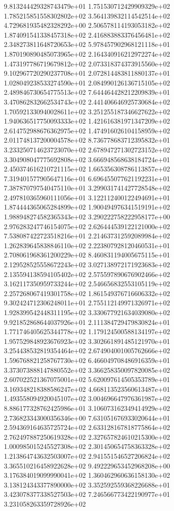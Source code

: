 9.813244429328743479e+01 1.751530712429909329e+02 1.785215851558302802e+02
3.564139832114542514e+02 4.729681935482328292e+00 2.506578114193053182e+02
1.874091541338457318e+02 2.416883883376456481e+02 2.348273811648720653e+02
5.978457902968121118e+01 1.870190890485073965e+02 2.164340916212972274e+02
1.473197786719679812e+02 2.073318374373915560e+02 9.102967720290237708e+01
2.072814483811880137e+01 1.028049238533274590e+01 2.084990126136715105e+02
2.489846730654775513e+02 7.644464428212209839e+01 3.470862832662534743e+02
2.441406646925730684e+02 1.705921330940028611e+02 3.251255187346627622e+02
1.940636517750093333e+02 1.421616381971347209e+02 2.614752988676362975e+02
1.474916026104158959e+02 2.011748137200004578e+02 8.736778683712395832e+01
3.233250714623723070e+02 2.678947271302723152e+02 3.304908047775692808e+02
3.666948568638184724e+01 2.450374616210721115e+02 1.665356308786113857e+02
7.319401577905647116e+01 6.696455077621192231e+01 7.387870797540475110e+01
3.299031741427728548e+02 2.497810365960111056e+01 3.122112400122494691e+01
1.874444365065284899e+02 1.900494976341519191e+02 1.988948274582365343e+02
3.290222758222958177e+00 2.976283247746154075e+02 2.626444539122121000e+02
7.538087422723518216e+01 2.214637312592089984e+02 1.262839645838846110e+02
2.223807928120460531e+01 2.708061968361200229e+02 8.460831194005675115e+01
2.129528525558672243e+02 3.027138972171923683e+02 2.135594138594105402e+02
2.575597890676902466e+02 3.162117350959733244e+02 2.546656832553105119e+02
2.257268067419301758e+02 1.861549376716606332e+02 9.302424712306248011e+01
2.755112149971326971e+02 1.928399542448311195e+02 3.330677921634039080e+02
9.921852868644037926e+01 2.111384729479830824e+01 1.771746405625344778e+02
1.179124500588134197e+02 1.957529848923676923e+02 3.302661891485121970e+01
3.254438532819354464e+02 2.674904001005762666e+02 1.596768821258767730e+02
6.466049708486916359e+01 3.373073888147880552e+02 3.366258350097820085e+02
2.607022521367075001e+02 5.620097614505353789e+01 3.169348218388586247e+02
4.668113523560613487e+01 1.493558094920045107e+02 3.004696647976361987e+02
8.886177328762425986e+01 3.106073162349414929e+02 2.736823343000356346e+00
7.631051676933020644e+01 2.594369164635725724e+02 2.633128167818775864e+02
2.762497887250619328e+02 2.327657824610215300e+02 1.000985015245527308e+02
2.301450654758363328e+02 1.213864743632503007e+02 2.941551546527206824e+02
3.365510216458922628e+02 9.492229653452968208e+00 3.176384019099990041e+02
1.360462960636158130e+02 3.138124343377890000e+02 3.352592559368226688e+01
3.423078377338527503e+02 7.246566773422190977e+01 3.231058263359728926e+02
